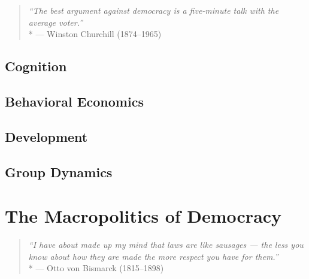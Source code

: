 \begin{quote}
	\emph{``The best argument against democracy is a five-minute talk with the average voter.''}
	\\*
	--- Winston Churchill (1874--1965)
\end{quote}


	\subsection[Cognition]{Cognition}

	\subsection[Behavior]{Behavioral Economics}

	\subsection[Development]{Development}


	\subsection[Group Dynamics]{Group Dynamics}

\section[Macropolitics]{The Macropolitics of Democracy} %

\begin{quote}
	\emph{``I have about made up my mind that laws are like sausages ---
	the less you know about how they are made the more respect you have for them.''}
	\\*
	--- Otto von Bismarck (1815--1898)
\end{quote}

